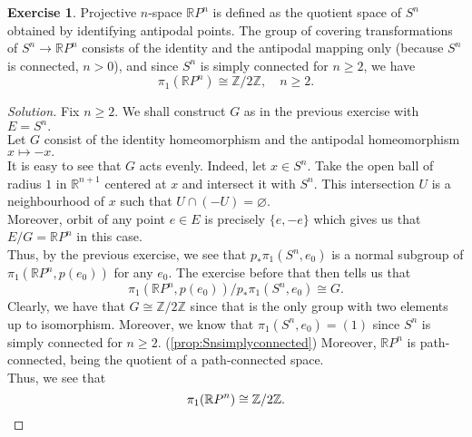 \documentclass[12pt]{article}
\theoremstyle{definition}
\numberwithin{thm}{section}
\newtheorem{exe}[thm]{Exercise}
\let\emptyset\varnothing
\newenvironment{soln}{\begin{proof}[Solution]}{\end{proof}}
\begin{document}
\begin{exe}
	Projective $n$-space $\mathbb{R}P^n$ is defined as the quotient space of $S^n$ obtained by identifying antipodal points. The group of covering transformations of $S^n \to \mathbb{R}P^n$ consists of the identity and the antipodal mapping only (because $S^n$ is connected, $n > 0$), and since $S^n$ is simply connected for $n \ge 2$, we have
	\begin{equation*} 
		\pi_1(\mathbb{R}P^n) \cong \mathbb{Z}/2\mathbb{Z}, \quad n \ge 2.
	\end{equation*}
\end{exe}
\begin{soln}
	Fix $n \ge 2.$ We shall construct $G$ as in the previous exercise with $E = S^n.$\\
	Let $G$ consist of the identity homeomorphism and the antipodal homeomorphism $x \mapsto -x.$\\
	It is easy to see that $G$ acts evenly. Indeed, let $x \in S^n.$ Take the open ball of radius $1$ in $\mathbb{R}^{n+1}$ centered at $x$ and intersect it with $S^n.$ This intersection $U$ is a neighbourhood of $x$ such that $U \cap (-U) = \emptyset.$\\
	Moreover, orbit of any point $e \in E$ is precisely $\{e, -e\}$ which gives us that $E/G = \mathbb{R}P^n$ in this case.\\
	Thus, by the previous exercise, we see that $p_*\pi_1(S^n, e_0)$ is a normal subgroup of $\pi_1(\mathbb{R}P^n, p(e_0))$ for any $e_0.$ The exercise before that then tells us that
	\begin{equation*} 
		\pi_1(\mathbb{R}P^n, p(e_0))/p_*\pi_1(S^n, e_0) \cong G.
	\end{equation*}
	Clearly, we have that $G \cong \mathbb{Z}/2\mathbb{Z}$ since that is the only group with two elements up to isomorphism. Moreover, we know that $\pi_1(S^n, e_0) = (1)$ since $S^n$ is simply connected for $n \ge 2.$ (\cref{prop:Snsimplyconnected}) Moreover, $\mathbb{R}P^n$ is path-connected, being the quotient of a path-connected space. \\
	Thus, we see that
	\begin{equation*} 
		\pi_1(\mathbb{R}P^n) \cong \mathbb{Z}/2\mathbb{Z}. \qedhere
	\end{equation*}
\end{soln}
\end{document}

